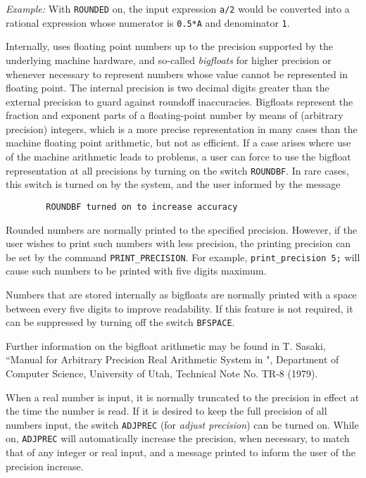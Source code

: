 {\it Example:} With {\tt ROUNDED} on, the input expression {\tt a/2} would
be converted into a rational expression whose numerator is {\tt 0.5*A} and
denominator {\tt 1}.

Internally, {\REDUCE} uses floating point numbers up to the precision
supported by the underlying machine hardware, and so-called {\em
bigfloats} for higher precision or whenever necessary to represent numbers
whose value cannot be represented in floating point.  The internal
precision is two decimal digits greater than the external precision to
guard against roundoff inaccuracies.  Bigfloats represent the fraction and
exponent parts of a floating-point number by means of (arbitrary
precision) integers, which is a more precise representation in many cases
than the machine floating point arithmetic, but not as efficient.  If a
case arises where use of the machine arithmetic leads to problems, a user
can force {\REDUCE} to use the bigfloat representation at all precisions by
turning on the switch {\tt ROUNDBF}.   In rare cases,
this switch is turned on by the system, and the user informed by the
message
\begin{verbatim}
        ROUNDBF turned on to increase accuracy
\end{verbatim}

Rounded numbers are normally printed to the specified precision.  However,
if the user wishes to print such numbers with less precision, the printing
precision can be set by the command {\tt PRINT\_PRECISION}.
 For example, {\tt print\_precision 5;} will
cause such numbers to be printed with five digits maximum.

Numbers that are stored internally as bigfloats are normally printed with
a space between every five digits to improve readability.  If this
feature is not required, it can be suppressed by turning off the switch
{\tt BFSPACE}. 

Further information on the bigfloat arithmetic may be found in T. Sasaki,
``Manual for Arbitrary Precision Real Arithmetic System in {\REDUCE}",
Department of Computer Science, University of Utah, Technical Note No.
TR-8 (1979).

When a real number is input, it is normally truncated to the precision in
effect at the time the number is read.  If it is desired to keep the full
precision of all numbers input, the switch {\tt ADJPREC} 
(for {\em adjust precision}) can be turned on.  While on, {\tt ADJPREC}
will automatically increase the precision, when necessary, to match that
of any integer or real input, and a message printed to inform the user of
the precision increase.

